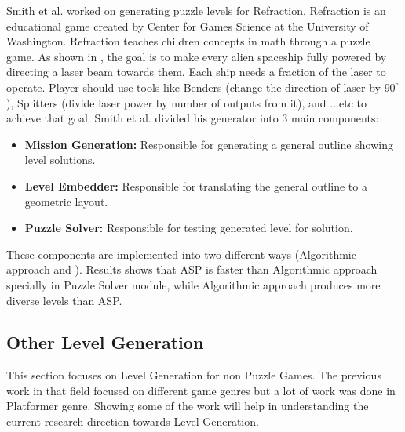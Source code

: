
Smith et al.\cite{refractionStudy} worked on generating puzzle levels for Refraction. Refraction is an educational game created by Center for Games Science at the University of Washington. Refraction teaches children concepts in math through a puzzle game. As shown in , the goal is to make every alien spaceship fully powered by directing a laser beam towards them. Each ship needs a fraction of the laser to operate. Player should use tools like Benders (change the direction of laser by $90^{\circ}$), Splitters (divide laser power by number of outputs from it), and ...etc to achieve that goal. Smith et al. divided his generator into 3 main components: 
\begin{itemize} \itemsep0pt \parskip0pt 
	\item \textbf{Mission Generation:} Responsible for generating a general outline showing level solutions. 
	\item \textbf{Level Embedder:} Responsible for translating the general outline to a geometric layout.
	\item \textbf{Puzzle Solver:} Responsible for testing generated level for solution.
\end{itemize} 
These components are implemented into two different ways (Algorithmic approach and ). Results shows that ASP is faster than Algorithmic approach specially in Puzzle Solver module, while Algorithmic approach produces more diverse levels than ASP.

\subsection{Other Level Generation}
This section focuses on Level Generation for non Puzzle Games. The previous work in that field focused on different game genres but a lot of work was done in Platformer genre. Showing some of the work will help in understanding the current research direction towards Level Generation.\\\par

